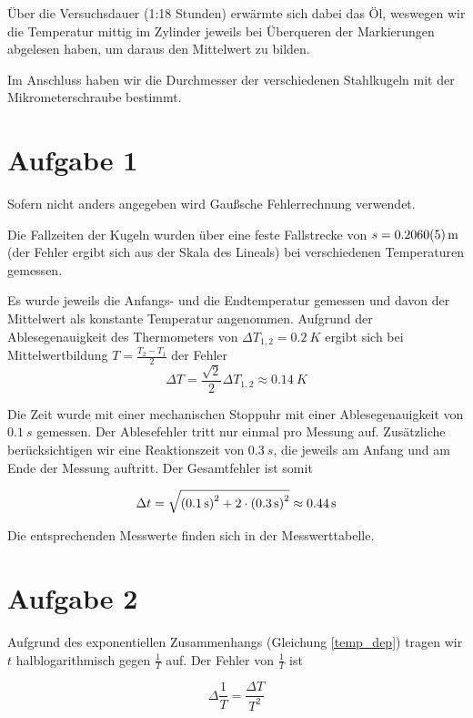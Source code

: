 \documentclass[a4paper,german,12pt,smallheadings]{scrartcl}
\begin{document}
Über die Versuchsdauer (1:18 Stunden) erwärmte sich dabei das Öl, weswegen wir
die Temperatur mittig im Zylinder jeweils bei Überqueren der Markierungen
abgelesen haben, um daraus den Mittelwert zu bilden.

Im Anschluss haben wir die Durchmesser der verschiedenen Stahlkugeln mit der
Mikrometerschraube bestimmt.

\section*{Aufgabe 1}
Sofern nicht anders angegeben wird Gaußsche Fehlerrechnung verwendet.


Die Fallzeiten der Kugeln wurden über eine feste Fallstrecke von $s =
\SI{0.2060+-0.0005}{m}$ (der Fehler ergibt sich aus der Skala des Lineals) bei
verschiedenen Temperaturen gemessen.

Es wurde jeweils die Anfangs- und die Endtemperatur gemessen und davon der
Mittelwert als konstante Temperatur angenommen. Aufgrund der Ablesegenauigkeit
des Thermometers von $\Delta T_{1,2} = \SI{0.2}{K}$ ergibt sich bei Mittelwertbildung
$T = \frac{T_2 - T_1}{2}$ der Fehler
\begin{equation}
  \Delta T = \frac{\sqrt{2}}{2} \Delta T_{1,2} \approx \SI{0.14}{K}
\end{equation}

Die Zeit wurde mit einer mechanischen Stoppuhr mit einer Ablesegenauigkeit von
$ \SI{0.1}{s}$ gemessen. Der Ablesefehler tritt nur einmal pro Messung auf.
Zusätzliche berücksichtigen wir eine Reaktionszeit von $\SI{0.3}{s}$, die
jeweils am Anfang und am Ende der Messung auftritt. Der Gesamtfehler ist somit

\begin{equation}
  \Delta t = \sqrt{\del{\SI{0.1}{s}}^2 + 2 \cdot \del{\SI{0.3}{s}}^2} \approx \SI{0.44}{s}
\end{equation}

Die entsprechenden Messwerte finden sich in der Messwerttabelle.

\section*{Aufgabe 2}


Aufgrund des exponentiellen Zusammenhangs (Gleichung \ref{temp_dep}) tragen wir
$t$ halblogarithmisch gegen $\frac{1}{T}$ auf. Der Fehler von $\frac{1}{T}$ ist

\begin{equation}
  \Delta \frac{1}{T} = \frac{\Delta T}{T^2}
\end{equation}
\end{document}

